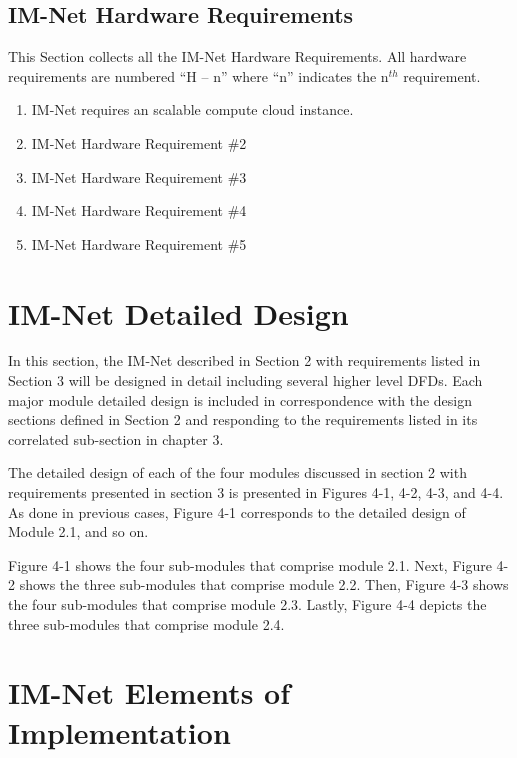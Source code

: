 \documentclass[letterpaper]{article}
\begin{document}
\subsection{IM-Net Hardware Requirements}

This Section collects all the IM-Net Hardware Requirements. All hardware requirements are numbered ``H -- n'' where ``n'' indicates the n${}^{th}$ requirement.

\begin{enumerate}
\item  IM-Net requires an scalable compute cloud instance.

\item  IM-Net Hardware Requirement \#2

\item  IM-Net Hardware Requirement \#3

\item  IM-Net Hardware Requirement \#4

\item  IM-Net Hardware Requirement \#5
\end{enumerate}

\eject

\section{IM-Net Detailed Design}

In this section, the IM-Net described in Section 2 with requirements listed in Section 3 will be designed in detail including several higher level DFDs. Each major module detailed design is included in correspondence with the design sections defined in Section 2 and responding to the requirements listed in its correlated sub-section in chapter 3.

The detailed design of each of the four modules discussed in section 2 with requirements presented in section 3 is presented in Figures 4-1, 4-2, 4-3, and 4-4. As done in previous cases, Figure 4-1 corresponds to the detailed design of Module 2.1, and so on.

Figure 4-1 shows the four sub-modules that comprise module 2.1. Next, Figure 4-2 shows the three sub-modules that comprise module 2.2. Then, Figure 4-3 shows the four sub-modules that comprise module 2.3. Lastly, Figure 4-4 depicts the three sub-modules that comprise module 2.4.

\eject 

 
\section{IM-Net Elements of Implementation}
\end{document}

